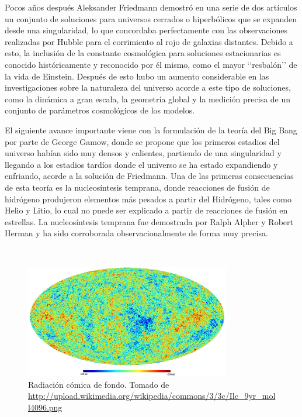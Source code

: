 Pocos años después Aleksander Friedmann demostró en una serie de dos 
artículos un conjunto de soluciones para universos cerrados o hiperbólicos
que se expanden desde una singularidad, lo que concordaba perfectamente 
con las observaciones realizadas por Hubble para el corrimiento al rojo de 
galaxias distantes. Debido a esto, la inclusión de la constante cosmológica 
para soluciones estacionarias es conocido históricamente y reconocido por él
mismo, como el mayor ‘‘resbalón’’ de la vida de Einstein. Después de esto
hubo un aumento considerable en las investigaciones sobre la naturaleza del 
universo acorde a este tipo de soluciones, como la dinámica a gran escala, 
la geometría global y la medición precisa de un conjunto de parámetros 
cosmológicos de los modelos.


El siguiente avance importante viene con la formulación de la teoría del 
Big Bang por parte de George Gamow, donde se propone que los primeros
estadios del universo habían sido muy densos y calientes, partiendo de una
singularidad y llegando a los estadios tardíos donde el universo se ha 
estado expandiendo y enfriando, acorde a la solución de Friedmann. Una
de las primeras consecuencias de esta teoría es la nucleosíntesis temprana,
donde reacciones de fusión de hidrógeno produjeron elementos más pesados 
a partir del Hidrógeno, tales como Helio y Litio, lo cual no puede ser 
explicado a partir de reacciones de fusión en estrellas. La nucleosíntesis
temprana fue demostrada por Ralph Alpher y Robert Herman y ha sido 
corroborada observacionalmente de forma muy precisa.

\
\begin{figure}[htbp]
	\centering
	\includegraphics[width=0.8\textwidth]
	{./figures/1_introduction/CMB.png}
	
	\caption{\small{Radiación cómica de fondo. Tomado de 
	\url{http://upload.wikimedia.org/wikipedia/commons/3/3c/Ilc_9yr_moll4096.png}}}
	
	\label{fig:CMB}
\end{figure}


